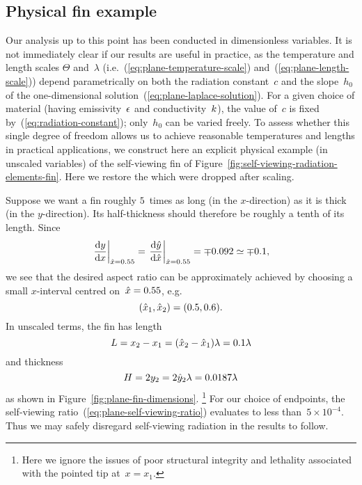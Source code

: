 \begin{figure}
\end{figure}

\subsection{Physical fin example}
\label{sec:cartesian.plane.fin}

Our analysis up to this point
has been conducted in dimensionless variables.
It is not immediately clear if our results are useful in practice,
as the temperature and length scales $\Theta$ and~$\lambda$
(i.e.~(\ref{eq:plane-temperature-scale}) and~(\ref{eq:plane-length-scale}))
depend parametrically
on both the radiation constant~$c$
and the slope~$h_0$
of the one-dimensional solution~(\ref{eq:plane-laplace-solution}).
For a given choice of material
(having emissivity~$\epsilon$ and conductivity~$k$),
the value of~$c$ is fixed by~(\ref{eq:radiation-constant});
only~$h_0$ can be varied freely.
To assess whether this single degree of freedom allows us to achieve
reasonable temperatures and lengths in practical applications,
we construct here an explicit physical example (in unscaled variables)
of the self-viewing fin
of Figure~\ref{fig:self-viewing-radiation-elements-fin}.
Here we restore the \scalingmarks{} which were dropped after scaling.

Suppose we want a fin
roughly $5$~times as long (in the $x$-direction)
as it is thick (in the $y$-direction).
Its half-thickness should therefore be roughly a tenth of its length.
Since
\[
  \eval*{\tder{y}{x}}_{\scaled{x}=0.55}
    = \eval*{\tder{\scaled{y}}{\scaled{x}}}_{\scaled{x}=0.55}
    = \mp 0.092
    \approx \mp 0.1,
\]
we see that the desired aspect ratio can be approximately achieved
by choosing a small $x$-interval centred on~$\hat{x}=0.55$,
e.g.
\begin{equation}
  (\hat{x}_1, \hat{x}_2) = (0.5, 0.6).
  \label{eq:plane-fin-interval}
\end{equation}
In unscaled terms, the fin has length
\begin{equation}
  L = x_2 - x_1 = (\hat{x}_2 - \hat{x}_1) \lambda = 0.1 \lambda
  \label{eq:plane-fin-length}
\end{equation}
and thickness
\begin{equation}
  H = 2 y_2 = 2 \hat{y}_2 \lambda = 0.0187 \lambda
  \label{eq:plane-fin-thickness}
\end{equation}
as shown in Figure~\ref{fig:plane-fin-dimensions}.%
\footnote{
  Here we ignore the issues of poor structural integrity and lethality
  associated with the pointed tip at~$x = x_1$.
}
For our choice of endpoints,
the self-viewing ratio~(\ref{eq:plane-self-viewing-ratio})
evaluates to less than~$5 \times 10^{-4}$.
Thus we may safely disregard self-viewing radiation
in the results to follow.

